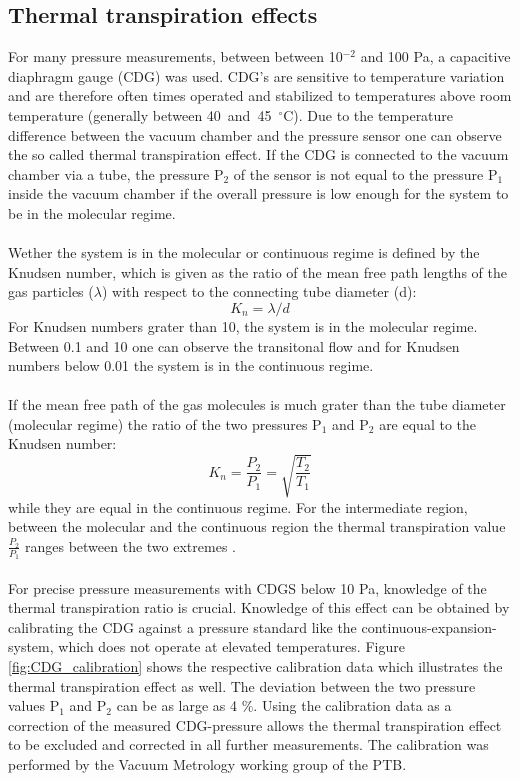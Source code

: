\subsection{Thermal transpiration effects}
For many pressure measurements, between between 10$^{-2}$ and 100 Pa, a capacitive diaphragm gauge (CDG) was used.
CDG's are sensitive to temperature variation and are therefore often times operated and stabilized to temperatures above room temperature (generally between \mbox{40 and 45 $^{\circ}$C}). Due to the temperature difference between the vacuum chamber and the pressure sensor one can observe the so called thermal transpiration effect. If the CDG is connected to the vacuum chamber via a tube, the pressure P$_2$ of the sensor is not equal to the pressure P$_1$ inside the vacuum chamber if the overall pressure is low enough for the system to be in the molecular regime\cite{Setina-1999}.\\\\
\noindent
Wether the system is in the molecular or continuous regime is defined by the Knudsen number, which is given as the ratio of the mean free path lengths of the gas particles ($\lambda$) with respect to the connecting tube diameter (d):
\begin{equation}
	K_n= \lambda/d
\end{equation}
For Knudsen numbers grater than 10, the system is in the molecular regime. Between 0.1 and 10 one can observe the transitonal flow and for Knudsen numbers below 0.01 the system is in the continuous regime.\\\\
\noindent
If the mean free path of the gas molecules is much grater than the tube diameter (molecular regime) the ratio of the two pressures P$_1$ and P$_2$ are equal to the Knudsen number:
\begin{equation}
	K_n= \frac{P_2}{P_1}= \sqrt{\frac{T_2}{T_1}}
\end{equation}
while they are equal in the continuous regime. For the intermediate region, between the molecular and the continuous region the thermal transpiration value $\frac{P_2}{P_1}$ ranges between the two extremes \cite{Takaishi-1963}. \\\\
\noindent
For precise pressure measurements with CDGS below 10 Pa, knowledge of the thermal transpiration ratio is crucial. Knowledge of this effect can be obtained by calibrating the CDG against a pressure standard like the continuous-expansion-system, which does not operate at elevated temperatures. Figure \ref{fig:CDG_calibration} shows the respective calibration data which illustrates the thermal transpiration effect as well. The deviation between the two pressure values P$_1$ and P$_2$ can be as large as 4 \%. Using the calibration data as a correction of the measured CDG-pressure allows the thermal transpiration effect to be excluded and corrected in all further measurements. The calibration was performed by the Vacuum Metrology working group of the PTB.
